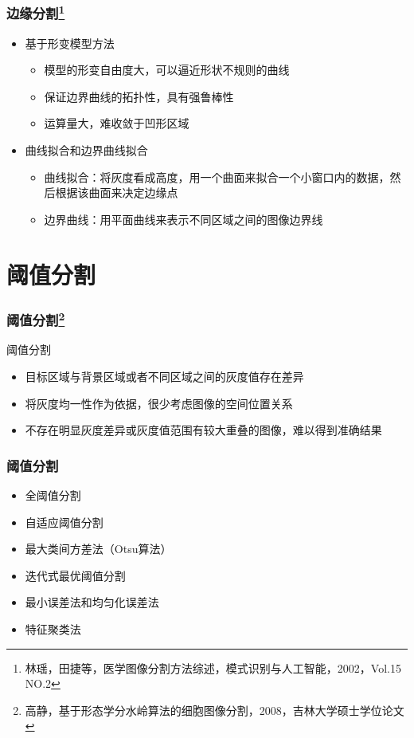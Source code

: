 \documentclass[notheorems,mathserif,table,compress]{beamer}  %
\begin{document}
\begin{frame}
  \frametitle{边缘分割\footnote{林瑶，田捷等，医学图像分割方法综述，模式识别与人工智能，2002，Vol.15 NO.2}}
  \begin{itemize}
  \item 基于形变模型方法
       \begin{itemize}
       \item 模型的形变自由度大，可以逼近形状不规则的曲线
       \item 保证边界曲线的拓扑性，具有强鲁棒性
       \item 运算量大，难收敛于凹形区域
       \end{itemize}
  \item 曲线拟合和边界曲线拟合
       \begin{itemize}
       \item 曲线拟合：将灰度看成高度，用一个曲面来拟合一个小窗口内的数据，然后根据该曲面来决定边缘点
       \item 边界曲线：用平面曲线来表示不同区域之间的图像边界线
       \end{itemize}
  \end{itemize}
\end{frame}

\section{阈值分割}
\begin{frame}
  \frametitle{阈值分割\footnote{高静，基于形态学分水岭算法的细胞图像分割，2008，吉林大学硕士学位论文}}
  阈值分割
  \begin{itemize}
  \item 目标区域与背景区域或者不同区域之间的灰度值存在差异
  \item 将灰度均一性作为依据，很少考虑图像的空间位置关系
  \item 不存在明显灰度差异或灰度值范围有较大重叠的图像，难以得到准确结果
  \end{itemize}
\end{frame}


\begin{frame}
  \frametitle{阈值分割}
  \begin{itemize}
  \item 全阈值分割
  \item 自适应阈值分割
  \item 最大类间方差法（Otsu算法）
  \item 迭代式最优阈值分割
  \item 最小误差法和均匀化误差法
  \item 特征聚类法
  \end{itemize}
\end{frame}
\end{document}
